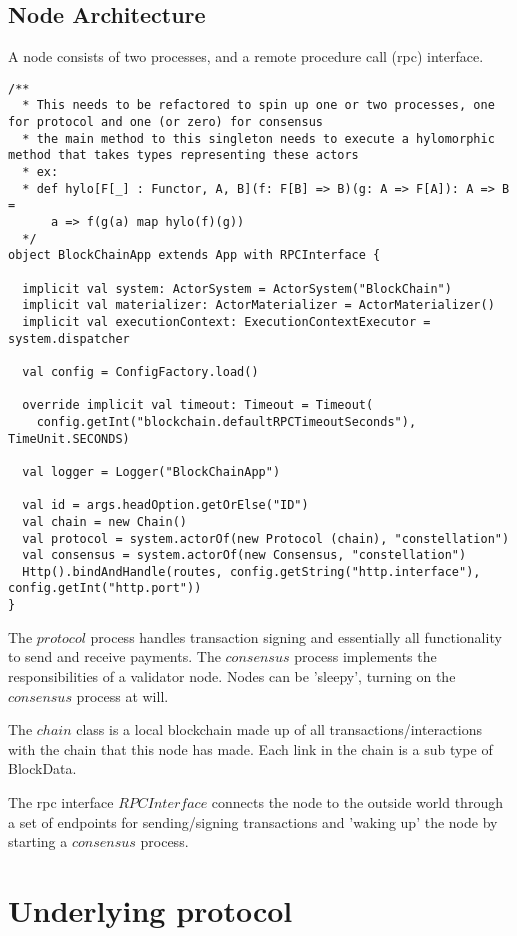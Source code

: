 \documentclass{article}
\begin{document}
\subsection{Node Architecture}
A node consists of two processes, and a remote procedure call (rpc) interface. 

\begin{lstlisting}
/**
  * This needs to be refactored to spin up one or two processes, one for protocol and one (or zero) for consensus
  * the main method to this singleton needs to execute a hylomorphic method that takes types representing these actors
  * ex:
  * def hylo[F[_] : Functor, A, B](f: F[B] => B)(g: A => F[A]): A => B =
      a => f(g(a) map hylo(f)(g))
  */
object BlockChainApp extends App with RPCInterface {

  implicit val system: ActorSystem = ActorSystem("BlockChain")
  implicit val materializer: ActorMaterializer = ActorMaterializer()
  implicit val executionContext: ExecutionContextExecutor = system.dispatcher

  val config = ConfigFactory.load()

  override implicit val timeout: Timeout = Timeout(
    config.getInt("blockchain.defaultRPCTimeoutSeconds"), TimeUnit.SECONDS)

  val logger = Logger("BlockChainApp")

  val id = args.headOption.getOrElse("ID")
  val chain = new Chain()
  val protocol = system.actorOf(new Protocol (chain), "constellation")
  val consensus = system.actorOf(new Consensus, "constellation")
  Http().bindAndHandle(routes, config.getString("http.interface"), config.getInt("http.port"))
}

\end{lstlisting}

The $protocol$ process handles transaction signing and essentially all functionality to send and receive payments. The $consensus$ process implements the responsibilities of a validator node. Nodes can be 'sleepy', turning on the $consensus$ process at will.

The $chain$ class is a local blockchain made up of all transactions/interactions with the chain that this node has made. Each link in the chain is a sub type of BlockData.

The rpc interface $RPCInterface$ connects the node to the outside world through a set of endpoints for sending/signing transactions and 'waking up' the node by starting a $consensus$ process.

\section{Underlying protocol}
\end{document}
